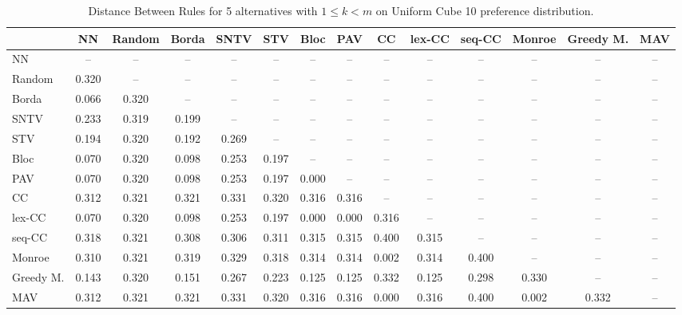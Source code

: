 
\begin{table*}
\centering
\begin{tabular}{lccccccccccccc}
\toprule
 & NN & Random & Borda & SNTV & STV & Bloc & PAV & CC & lex-CC & seq-CC & Monroe & Greedy M. & MAV \\
\midrule
NN & -- & -- & -- & -- & -- & -- & -- & -- & -- & -- & -- & -- & -- \\
Random & 0.320 & -- & -- & -- & -- & -- & -- & -- & -- & -- & -- & -- & -- \\
Borda & 0.066 & 0.320 & -- & -- & -- & -- & -- & -- & -- & -- & -- & -- & -- \\
SNTV & 0.233 & 0.319 & 0.199 & -- & -- & -- & -- & -- & -- & -- & -- & -- & -- \\
STV & 0.194 & 0.320 & 0.192 & 0.269 & -- & -- & -- & -- & -- & -- & -- & -- & -- \\
Bloc & 0.070 & 0.320 & 0.098 & 0.253 & 0.197 & -- & -- & -- & -- & -- & -- & -- & -- \\
PAV & 0.070 & 0.320 & 0.098 & 0.253 & 0.197 & 0.000 & -- & -- & -- & -- & -- & -- & -- \\
CC & 0.312 & 0.321 & 0.321 & 0.331 & 0.320 & 0.316 & 0.316 & -- & -- & -- & -- & -- & -- \\
lex-CC & 0.070 & 0.320 & 0.098 & 0.253 & 0.197 & 0.000 & 0.000 & 0.316 & -- & -- & -- & -- & -- \\
seq-CC & 0.318 & 0.321 & 0.308 & 0.306 & 0.311 & 0.315 & 0.315 & 0.400 & 0.315 & -- & -- & -- & -- \\
Monroe & 0.310 & 0.321 & 0.319 & 0.329 & 0.318 & 0.314 & 0.314 & 0.002 & 0.314 & 0.400 & -- & -- & -- \\
Greedy M. & 0.143 & 0.320 & 0.151 & 0.267 & 0.223 & 0.125 & 0.125 & 0.332 & 0.125 & 0.298 & 0.330 & -- & -- \\
MAV & 0.312 & 0.321 & 0.321 & 0.331 & 0.320 & 0.316 & 0.316 & 0.000 & 0.316 & 0.400 & 0.002 & 0.332 & -- \\
\bottomrule
\end{tabular}

\caption{Distance Between Rules for 5 alternatives with $1 \leq k < m$ on Uniform Cube 10 preference distribution.}
\end{table*}
